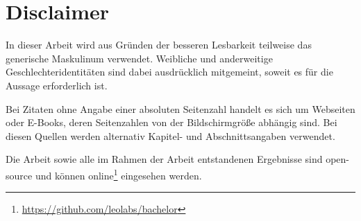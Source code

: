 \chapter*{Disclaimer}

In dieser Arbeit wird aus Gründen der besseren Lesbarkeit teilweise das
generische Maskulinum verwendet. Weibliche und anderweitige
Geschlechteridentitäten sind dabei ausdrücklich mitgemeint, soweit es
für die Aussage erforderlich ist.

Bei Zitaten ohne Angabe einer absoluten Seitenzahl handelt es sich um
Webseiten oder E-Books, deren Seitenzahlen von der Bildschirmgröße
abhängig sind. Bei diesen Quellen werden alternativ Kapitel- und
Abschnittsangaben verwendet.

Die Arbeit sowie alle im Rahmen der Arbeit entstandenen Ergebnisse sind
open-source und können online\footnote{\url{https://github.com/leolabs/bachelor}}
eingesehen werden.